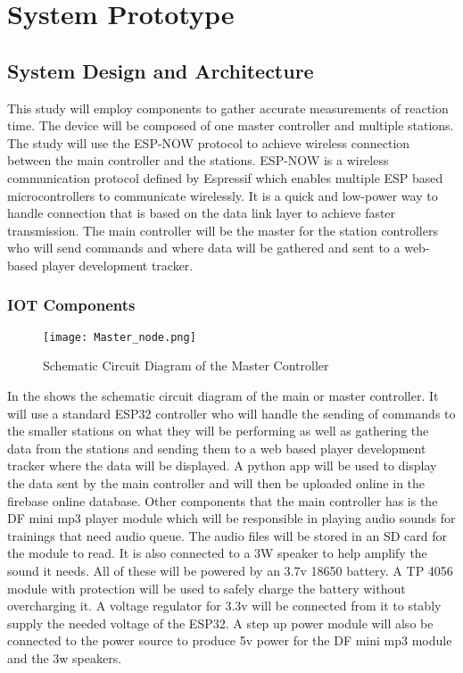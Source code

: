 \chapter{System Prototype}

\section{System Design and Architecture}
This study will employ components to gather accurate measurements of reaction time. The device will be composed of one master controller and multiple stations. The study will use the ESP-NOW protocol to achieve wireless connection between the main controller and the stations. ESP-NOW is a wireless communication protocol defined by Espressif which enables multiple ESP based microcontrollers to communicate wirelessly. It is a quick and low-power way to handle connection that is based on the data link layer to achieve faster transmission. The main controller will be the master for the station controllers who will send commands and where data will be gathered and sent to a web-based player development tracker.

\subsection{IOT Components}
\begin{figure}[h]               
	\centering                    
	\texttt{[image: Master\_node.png]}      
	\caption{Schematic Circuit Diagram of the Master Controller }
	\label{fig:Master_node}
\end{figure}

In the  shows the schematic circuit diagram of the main or master controller. It will use a standard ESP32 controller who will handle the sending of commands to the smaller stations on what they will be performing as well as gathering the data from the stations and sending them to a web based player development tracker where the data will be displayed. A python app will be used to display the data sent by the main controller and will then be uploaded online in the firebase online database. Other components that the main controller has is the DF mini mp3 player module which will be responsible in playing audio sounds for trainings that need audio queue. The audio files will be stored in an SD card for the module to read. It is also connected to a 3W speaker to help amplify the sound it needs. All of these will be powered by an 3.7v 18650 battery. A TP 4056 module  with protection will be used to safely charge the battery without overcharging it. A voltage regulator for 3.3v will be connected from it to stably supply the needed voltage of the ESP32. A step up power module will also be connected to the power source to produce 5v power for the DF mini mp3 module and the 3w speakers.

